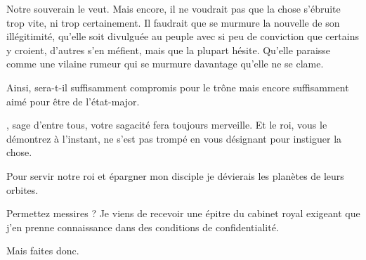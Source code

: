\begin{drama}
  \generalspeaks Notre souverain le veut. Mais encore, il ne voudrait pas que la chose s’ébruite trop vite, ni trop certainement. Il faudrait que se murmure la nouvelle de son illégitimité, qu’elle soit divulguée au peuple avec si peu de conviction que certains y croient, d’autres s’en méfient, mais que la plupart hésite. Qu’elle paraisse comme une vilaine rumeur qui se murmure davantage qu’elle ne se clame.

  \elenaspeaks Ainsi,  sera-t-il suffisamment compromis pour le trône mais encore suffisamment aimé pour être de l’état-major.

  \generalspeaks \alexas, sage d’entre tous, votre sagacité fera toujours merveille. Et le roi, vous le démontrez à l’instant, ne s’est pas trompé en  vous désignant pour instiguer la chose.

  \alexasspeaks Pour servir notre roi et épargner mon disciple je dévierais les planètes de leurs orbites.


  \alexasspeaks Permettez messires ? Je viens de recevoir une épitre du cabinet royal exigeant que  j’en prenne connaissance dans des conditions de confidentialité.

  \generalspeaks Mais faites donc.
\end{drama}

\scene

\StageDirII{\elena, \general}


